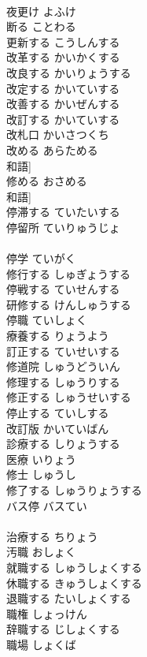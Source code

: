 \documentclass[8pt]{extreport}
\begin{document}
\begin{CJK}{UTF8}{min}
\\	夜更け	よふけ	
\\	断る	ことわる	
\\	更新する	こうしんする	
\\	改革する	かいかくする	
\\	改良する	かいりょうする	
\\	改定する	かいていする	
\\	改善する	かいぜんする	
\\	改訂する	かいていする	
\\	改札口	かいさつくち	
\\	改める	あらためる	
\\	和語]
\\	修める	おさめる	
\\	和語]
\\	停滞する	ていたいする	
\\	停留所	ていりゅうじょ	
\\	[漢語]
\\	停学	ていがく	
\\	修行する	しゅぎょうする	
\\	停戦する	ていせんする	
\\	研修する	けんしゅうする	
\\	停職	ていしょく	
\\	療養する	りょうよう	
\\	訂正する	ていせいする	
\\	修道院	しゅうどういん	
\\	修理する	しゅうりする	
\\	修正する	しゅうせいする	
\\	停止する	ていしする	
\\	改訂版	かいていばん	
\\	診療する	しりょうする	
\\	医療	いりょう	
\\	修士	しゅうし	
\\	修了する	しゅうりょうする	
\\	バス停	バスてい	
\\	[借用語]
\\	治療する	ちりょう	
\\	汚職	おしょく	
\\	就職する	しゅうしょくする	
\\	休職する	きゅうしょくする	
\\	退職する	たいしょくする	
\\	職権	しょっけん	
\\	辞職する	じしょくする	
\\	職場	しょくば	

\end{CJK}
\end{document}
